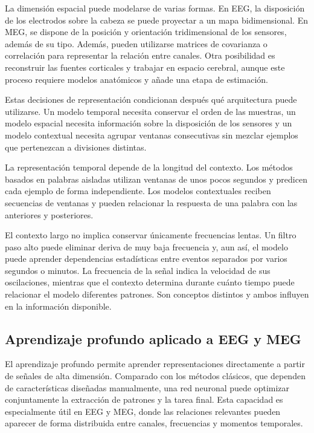 La dimensión espacial puede modelarse de varias formas. En EEG, la disposición de los electrodos sobre la cabeza se puede proyectar a un mapa bidimensional. En MEG, se dispone de la posición y orientación tridimensional de los sensores, además de su tipo. Además, pueden utilizarse matrices de covarianza o correlación para representar la relación entre canales. Otra posibilidad es reconstruir las fuentes corticales y trabajar en espacio cerebral, aunque este proceso requiere modelos anatómicos y añade una etapa de estimación.

Estas decisiones de representación condicionan después qué arquitectura puede utilizarse. Un modelo temporal necesita conservar el orden de las muestras, un modelo espacial necesita información sobre la disposición de los sensores y un modelo contextual necesita agrupar ventanas consecutivas sin mezclar ejemplos que pertenezcan a divisiones distintas.

La representación temporal depende de la longitud del contexto. Los métodos basados en palabras aisladas utilizan ventanas de unos pocos segundos y predicen cada ejemplo de forma independiente. Los modelos contextuales reciben secuencias de ventanas y pueden relacionar la respuesta de una palabra con las anteriores y posteriores.

El contexto largo no implica conservar únicamente frecuencias lentas. Un filtro paso alto puede eliminar deriva de muy baja frecuencia y, aun así, el modelo puede aprender dependencias estadísticas entre eventos separados por varios segundos o minutos. La frecuencia de la señal indica la velocidad de sus oscilaciones, mientras que el contexto determina durante cuánto tiempo puede relacionar el modelo diferentes patrones. Son conceptos distintos y ambos influyen en la información disponible.

\subsection{Aprendizaje profundo aplicado a EEG y MEG}

El aprendizaje profundo permite aprender representaciones directamente a partir de señales de alta dimensión. Comparado con los métodos clásicos, que dependen de características diseñadas manualmente, una red neuronal puede optimizar conjuntamente la extracción de patrones y la tarea final. Esta capacidad es especialmente útil en EEG y MEG, donde las relaciones relevantes pueden aparecer de forma distribuida entre canales, frecuencias y momentos temporales.

